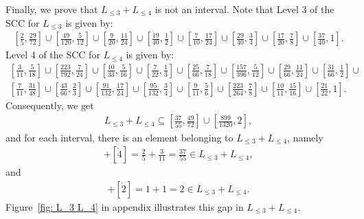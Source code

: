 \documentclass{ws-ijnt}
\begin{document}
	
	Finally, we prove that $L_{\leq 3}+L_{\leq 4}$ is not an interval. Note that Level 3 of the SCC for $L_{\leq 3}$ is given by:
	\begin{align*}
		\left[\frac{2}{5},\frac{29}{72}\right]\cup
		\left[\frac{49}{120},\frac{5}{12}\right]\cup
		\left[\frac{9}{20},\frac{11}{24}\right]\cup
		\left[\frac{19}{40},\frac{1}{2}\right]\cup
		\left[\frac{7}{10},\frac{17}{24}\right]\cup
		\left[\frac{29}{40},\frac{3}{4}\right]\cup
		\left[\frac{17}{20},\frac{7}{8}\right]\cup
		\left[\frac{37}{40},1\right].
	\end{align*}
	Level 4 of the SCC for $L_{\leq 4}$ is given by:
	\begin{align*}
		\left[\frac{3}{11}, \frac{5}{18}\right]\cup
		\left[\frac{223}{792}, \frac{7}{24}\right]\cup
		\left[\frac{10}{33}, \frac{5}{16}\right]\cup
		\left[\frac{7}{22}, \frac{1}{3}\right]\cup
		\left[\frac{25}{66}, \frac{7}{18}\right]\cup
		\left[\frac{157}{396}, \frac{5}{12}\right]\cup
		\left[\frac{29}{66}, \frac{11}{24}\right]\cup
		\left[\frac{31}{66}, \frac{1}{2}\right]\cup \\
		\left[\frac{7}{11}, \frac{31}{48}\right]\cup
		\left[\frac{43}{66}, \frac{2}{3}\right]\cup
		\left[\frac{91}{132}, \frac{17}{24}\right]\cup
		\left[\frac{95}{132}, \frac{3}{4}\right]\cup
		\left[\frac{9}{11}, \frac{5}{6}\right]\cup
		\left[\frac{223}{264}, \frac{7}{8}\right]\cup
		\left[\frac{10}{11}, \frac{15}{16}\right]\cup
		\left[\frac{21}{22}, 1\right].
	\end{align*}
	Consequently, we get
	\begin{align*}
		L_{\leq 3}+L_{\leq 4}
		\subseteq
		\left[\frac{37}{55},\frac{49}{72}\right] \cup
		\left[\frac{899}{1320},2\right]
		,
	\end{align*}
	and for each interval, there is an element belonging to $L_{\leq 3}+L_{\leq 4}$, namely
	\begin{align*}
		[\dot3]+[\dot4]=\frac{2}{5}+\frac{3}{11}=\frac{37}{55}\in L_{\leq 3}+L_{\leq 4},
	\end{align*}
	and
	\begin{align*}
		[\dot2]+[\dot2]=1+1=2\in L_{\leq 3}+L_{\leq 4}.
	\end{align*}
	Figure~\ref{fig: L_3 L_4} in appendix illustrates this gap in $L_{\leq 3}+L_{\leq 4}$.
	
\end{document}
